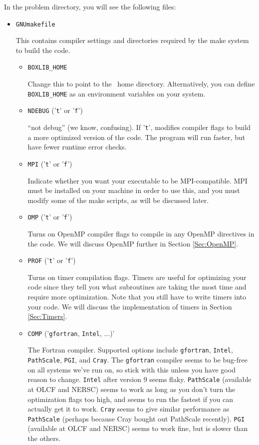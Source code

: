In the problem directory, you will see the following files:
\begin{itemize}
\item {\tt GNUmakefile}

This contains compiler settings and directories required by the make system to build the code.

  \begin{itemize}

    \item {\tt BOXLIB\_HOME}

    Change this to point to the \BoxLib\ home directory.  Alternatively, you can define {\tt BOXLIB\_HOME}
    as an environment variables on your system.

    \item {\tt NDEBUG} ('{\tt t}' or '{\tt f}')
      
    ``not debug'' (we know, confusing).  If '{\tt t}', modifies compiler flags to build a 
    more optimized version of the code.  The program will run faster, but have fewer 
    runtime error checks.

    \item {\tt MPI} ('{\tt t}' or '{\tt f}')

    Indicate whether you want your executable to be MPI-compatible.  MPI must be installed on your
    machine in order to use this, and you must modify some of the make scripts, as will be 
    discussed later.

    \item {\tt OMP} ('{\tt t}' or '{\tt f}')

    Turns on OpenMP compiler flags to compile in any OpenMP directives in the code.
    We will discuss OpenMP further in Section \ref{Sec:OpenMP}.

    \item {\tt PROF} ('{\tt t}' or '{\tt f}')

    Turns on timer compilation flags.  Timers are useful for optimizing your code since they tell you 
    what subroutines are taking the most time and require more optimization.  Note that you still have 
    to write timers into your code.  We will discuss the implementation of timers in Section \ref{Sec:Timers}.

    \item {\tt COMP} ('{\tt gfortran}, {\tt Intel}, $\ldots$)'

    The Fortran compiler.  Supported options include {\tt gfortran}, {\tt Intel}, 
    {\tt PathScale}, {\tt PGI}, and {\tt Cray}.  The {\tt gfortran} compiler seems to be 
    bug-free on all systems we've run on, so stick with this unless you have good reason to 
    change.  {\tt Intel} after version 9 seems flaky.  {\tt PathScale} (available 
    at OLCF and NERSC) seems to work as long as you don't turn the optimization flags 
    too high, and seems to run the fastest if you can actually get it to work.  
    {\tt Cray} seems to give similar performance as {\tt PathScale} (perhaps
    because Cray bought out PathScale recently).  {\tt PGI} (available at OLCF and NERSC) 
    seems to work fine, but is slower than the others.


\end{itemize}
\end{itemize}
